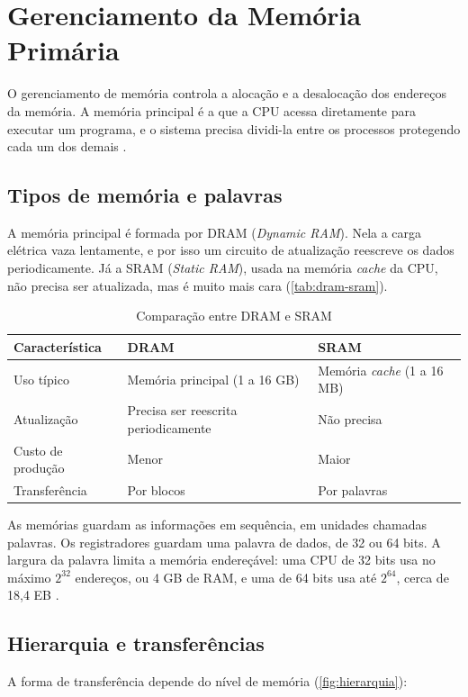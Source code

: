 \chapter{Gerenciamento da Memória Primária}\label{cap:memoria}
O gerenciamento de memória controla a alocação e a desalocação dos endereços da memória. A memória principal é a que a CPU acessa diretamente para executar um programa, e o sistema precisa dividi-la entre os processos protegendo cada um dos demais \cite{tanenbaum2016}.

\section{Tipos de memória e palavras}
A memória principal é formada por DRAM (\textit{Dynamic RAM}). Nela a carga elétrica vaza lentamente, e por isso um circuito de atualização reescreve os dados periodicamente. Já a SRAM (\textit{Static RAM}), usada na memória \textit{cache} da CPU, não precisa ser atualizada, mas é muito mais cara (\autoref{tab:dram-sram}).

\begin{table}[H]
  \centering
  \caption{Comparação entre DRAM e SRAM}\label{tab:dram-sram}
  \begin{tabularx}{\linewidth}{lXX}
    \toprule
    \textbf{Característica} & \textbf{DRAM} & \textbf{SRAM} \\
    \midrule
    Uso típico & Memória principal (1 a 16 GB) & Memória \textit{cache} (1 a 16 MB) \\
    Atualização & Precisa ser reescrita periodicamente & Não precisa \\
    Custo de produção & Menor & Maior \\
    Transferência & Por blocos & Por palavras \\
    \bottomrule
  \end{tabularx}
\end{table}

As memórias guardam as informações em sequência, em unidades chamadas palavras. Os registradores guardam uma palavra de dados, de 32 ou 64 bits. A largura da palavra limita a memória endereçável: uma CPU de 32 bits usa no máximo $2^{32}$ endereços, ou 4 GB de RAM, e uma de 64 bits usa até $2^{64}$, cerca de 18,4 EB \cite{machado2013}.

\section{Hierarquia e transferências}
A forma de transferência depende do nível de memória 
(\autoref{fig:hierarquia}):

